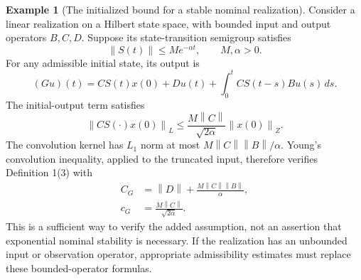 \documentclass[10pt,twocolumn,letterpaper]{article}
\theoremstyle{definition}
\newtheorem{example}{Example}
\theoremstyle{plain}
\newcommand{\norm}[1]{\left\lVert #1\right\rVert}
\begin{document}
\begin{example}[The initialized bound for a stable nominal realization]
Consider a linear realization on a Hilbert state space, with bounded
input and output operators $B,C,D$. Suppose its state-transition
semigroup satisfies
\[
 \norm{S(t)}\leq M e^{-\alpha t},\qquad M,\alpha>0.
\]
For any admissible initial state, its output is
\[
 (Gu)(t)=CS(t)x(0)+Du(t)
             +\int_0^t CS(t-s)Bu(s)\,ds.
\]
The initial-output term satisfies
\[
 \norm{CS(\cdot)x(0)}_L
 \leq\frac{M\norm{C}}{\sqrt{2\alpha}}\norm{x(0)}_Z.
\]
The convolution kernel has $L_1$ norm at most
$M\norm{C}\norm{B}/\alpha$. Young's convolution inequality, applied
to the truncated input, therefore verifies Definition 1(3) with
\begin{align*}
 C_G&=\norm{D}+\frac{M\norm{C}\norm{B}}{\alpha},\\
 c_G&=\frac{M\norm{C}}{\sqrt{2\alpha}}.
\end{align*}
This is a sufficient way to verify the added assumption, not an
assertion that exponential nominal stability is necessary. If the
realization has an unbounded input or observation operator, appropriate
admissibility estimates must replace these bounded-operator formulas.
\end{example}
\end{document}
